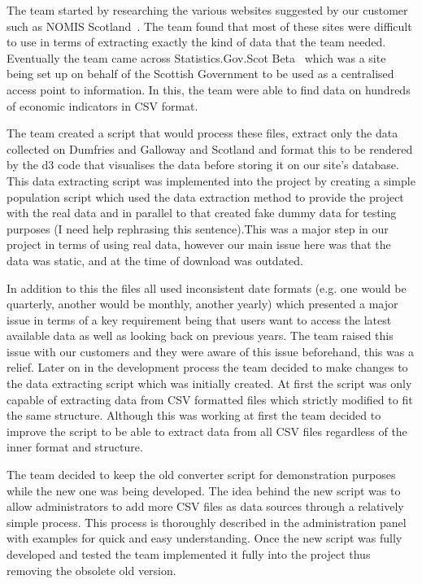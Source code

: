 \documentclass{l3proj}
\begin{document}
The team started by researching
the various websites suggested by our customer such as NOMIS Scotland~\cite{NOMISScot}. The team found that most of these
sites were difficult to use in terms of extracting exactly the kind of data that the team needed. Eventually the team
came across Statistics.Gov.Scot Beta~\cite{StatisticsScotBeta} which was a site being set up on behalf of the Scottish
Government to be used as a centralised access point to information. In this, the team were able to find data on hundreds
of economic indicators in CSV format.

The team created a script that would process these files, extract only the data collected on Dumfries and Galloway and
Scotland and format this to be rendered by the d3 code that visualises the data before storing it on our site's
database. This data extracting script was implemented into the project by creating a simple population script which used
the data extraction method to provide the project with the real data and in parallel to that created fake dummy data for
testing purposes (I need help rephrasing this sentence).This was a major step in our project in terms of using real
data, however our main issue here was that the data was static, and at the time of download was outdated.

In addition to this the files all used inconsistent date formats (e.g. one would be quarterly, another would be monthly,
another yearly) which presented a major issue in terms of a key requirement being that users want to access the latest
available data as well as looking back on previous years. The team raised this issue with our customers and they were aware of
this issue beforehand, this was a relief. Later on in the development process the team decided to make changes to the
data extracting script which was initially created. At first the script was only capable of extracting data from CSV
formatted files which strictly modified to fit the same structure. Although this was working at first the team decided
to improve the script to be able to extract data from all CSV files regardless of the inner format and structure.

The team decided to keep the old converter script for demonstration purposes while the new one was being developed.
The idea behind the new script was to allow administrators to add more CSV files as data sources through a relatively
simple process. This process is thoroughly described in the administration panel with examples for quick and easy
understanding. Once the new script was fully developed and tested the team implemented it fully into the project thus
removing the obsolete old version.
\end{document}
